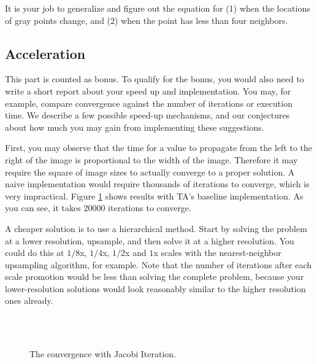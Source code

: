 \documentclass[12pt,a4paper]{article}
\newcommand{\figref}[1]{Figure \ref{fig:#1}}
\begin{document}
It is your job to generalize and figure out the equation for (1) when the locations of gray points change, and (2) when the point has less than four neighbors.

\subsection{Acceleration}

This part is counted as bonus.
To qualify for the bonus, you would also need to write a short report about your speed up and implementation.
You may, for example, compare convergence against the number of iterations or execution time.
We describe a few possible speed-up mechanisms, and our conjectures about how much you may gain from implementing these suggestions.

First, you may observe that
the time for a value to propagate from the left to the right of the image
is proportional to the width of the image.
Therefore it may require the square of image sizes to actually converge to a proper solution.
A naive implementation would require thousands of iterations to converge,
which is very impractical.
\figref{convergence} shows results with TA's baseline implementation.
As you can see, it takes 20000 iterations to converge.

A cheaper solution is to use a hierarchical method.
Start by solving the problem at a lower resolution, upsample, and then solve it at a higher resolution.
You could do this at $1/8$x, $1/4$x, $1/2$x and $1$x scales with the nearest-neighbor upsampling algorithm, for example.
Note that the number of iterations after each scale promotion would be less than solving the complete problem, because your lower-resolution solutions would look reasonably similar to the higher resolution ones already.

\begin{figure}
\centering
{}
\\
\\
\caption{The convergence with Jacobi Iteration.}\label{fig:convergence}
\end{figure}
\end{document}
